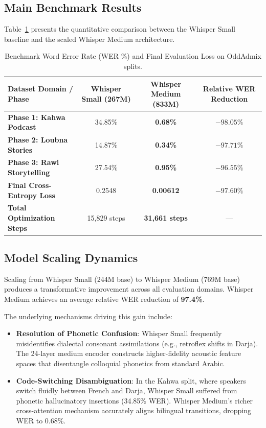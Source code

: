 \documentclass[11pt,a4paper]{article}
\begin{document}
\subsection{Main Benchmark Results}
Table~\ref{tab:main_results} presents the quantitative comparison between the Whisper Small baseline and the scaled Whisper Medium architecture.

\begin{table}[t]
\centering
\small
\renewcommand{\arraystretch}{1.25}
\caption{Benchmark Word Error Rate (WER \%) and Final Evaluation Loss on OddAdmix splits.}
\label{tab:main_results}
\begin{tabularx}{\textwidth}{@{} X c c c @{}}
\toprule
\textbf{Dataset Domain / Phase} & \textbf{Whisper Small (267M)} & \textbf{Whisper Medium (833M)} & \textbf{Relative WER Reduction} \\
\midrule
\textbf{Phase 1: Kahwa Podcast}     & 34.85\% & \textbf{0.68\%}  & \textbf{$-98.05\%$} \\
\textbf{Phase 2: Loubna Stories}    & 14.87\% & \textbf{0.34\%}  & \textbf{$-97.71\%$} \\
\textbf{Phase 3: Rawi Storytelling} & 27.54\% & \textbf{0.95\%}  & \textbf{$-96.55\%$} \\
\midrule
\textbf{Final Cross-Entropy Loss}   & 0.2548  & \textbf{0.00612} & \textbf{$-97.60\%$} \\
\textbf{Total Optimization Steps}   & 15,829 steps & \textbf{31,661 steps} & --- \\
\bottomrule
\end{tabularx}
\end{table}

\subsection{Model Scaling Dynamics}
Scaling from Whisper Small (244M base) to Whisper Medium (769M base) produces a transformative improvement across all evaluation domains. Whisper Medium achieves an average relative WER reduction of \textbf{97.4\%}. 

The underlying mechanisms driving this gain include:
\begin{itemize}[leftmargin=*]
    \item \textbf{Resolution of Phonetic Confusion}: Whisper Small frequently misidentifies dialectal consonant assimilations (e.g., retroflex shifts in Darja). The 24-layer medium encoder constructs higher-fidelity acoustic feature spaces that disentangle colloquial phonetics from standard Arabic.
    \item \textbf{Code-Switching Disambiguation}: In the Kahwa split, where speakers switch fluidly between French and Darja, Whisper Small suffered from phonetic hallucinatory insertions (34.85\% WER). Whisper Medium's richer cross-attention mechanism accurately aligns bilingual transitions, dropping WER to 0.68\%.
\end{itemize}
\end{document}
